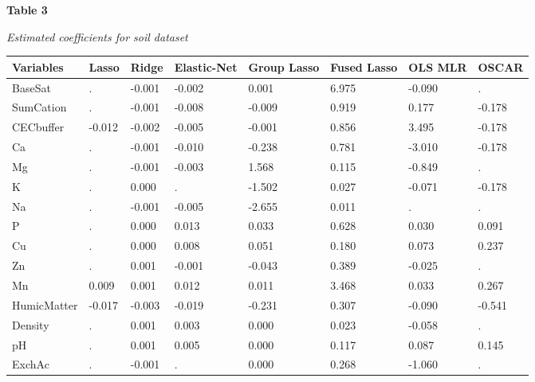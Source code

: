\documentclass{article} %
\begin{document}
\noindent 

\noindent 

\noindent 

\noindent 

\noindent 

\noindent \textbf{Table 3}

\noindent \textit{Estimated coefficients for soil dataset}

\begin{tabular}{|p{0.7in}|p{0.5in}|p{0.5in}|p{0.5in}|p{0.5in}|p{0.5in}|p{0.5in}|p{0.5in}|} \hline 
Variables & Lasso & Ridge & Elastic-Net & Group Lasso & Fused Lasso & OLS MLR & OSCAR \\ \hline 
BaseSat   & . & -0.001 & -0.002 & 0.001 & 6.975 & -0.090 & . \\ \hline 
SumCation     & . & -0.001 & -0.008 & -0.009 & 0.919 & 0.177 & -0.178 \\ \hline 
CECbuffer    & -0.012 & -0.002 & -0.005 & -0.001 & 0.856 & 3.495 & -0.178 \\ \hline 
Ca            & . & -0.001 & -0.010 & -0.238 & 0.781 & -3.010 & -0.178 \\ \hline 
Mg            & . & -0.001 & -0.003 & 1.568 & 0.115 & -0.849 & . \\ \hline 
K             & . & 0.000 & . & -1.502 & 0.027 & -0.071 & -0.178 \\ \hline 
Na & . & -0.001 & -0.005 & -2.655 & 0.011 & . & . \\ \hline 
P & . & 0.000 & 0.013 & 0.033 & 0.628 & 0.030 & 0.091 \\ \hline 
Cu & . & 0.000 & 0.008 & 0.051 & 0.180 & 0.073 & 0.237 \\ \hline 
Zn & . & 0.001 & -0.001 & -0.043 & 0.389 & -0.025 & . \\ \hline 
Mn & 0.009 & 0.001 & 0.012 & 0.011 & 3.468 & 0.033 & 0.267 \\ \hline 
HumicMatter & -0.017 & -0.003 & -0.019 & -0.231 & 0.307 & -0.090 & -0.541 \\ \hline 
Density & . & 0.001 & 0.003 & 0.000 & 0.023 & -0.058 & . \\ \hline 
pH & . & 0.001 & 0.005 & 0.000 & 0.117 & 0.087 & 0.145 \\ \hline 
ExchAc & . & -0.001 & . & 0.000 & 0.268 & -1.060 & . \\ \hline 
\end{tabular}



\noindent 
\end{document}
